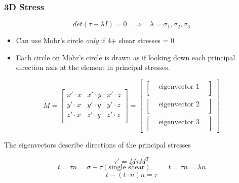 \documentclass[twocolumn, 12pt]{article}    %
\begin{document}
\subsubsection*{3D Stress}
\begin{equation*}
    det(\tau -\lambda I) = 0 \hspace{10pt}\Longrightarrow \hspace{10pt}\lambda = \sigma_1,\sigma_2,\sigma_3
\end{equation*}
\begin{itemize}
    \item Can use Mohr's circle \emph{only} if 4+ shear stresses = 0\\
    \item Each circle on Mohr's circle is drawn as if looking down each principal direction axis at the element in principal stresses. 
\end{itemize}
\begin{equation*}
    M= \begin{bmatrix}
    x'\cdot x & x'\cdot y & x' \cdot z\\
    y'\cdot x & y'\cdot y & y' \cdot z\\
    z'\cdot x & z'\cdot y & z' \cdot z\\
\end{bmatrix} = 
\begin{bmatrix}
    \begin{bmatrix}
        & \text{eigenvector 1} &\\
    \end{bmatrix}\\
    \begin{bmatrix}
        & \text{eigenvector 2} &\\
    \end{bmatrix}\\
    \begin{bmatrix}
        & \text{eigenvector 3} &\\
    \end{bmatrix}
\end{bmatrix}
\end{equation*}
\begin{center}
    The eigenvectors describe directions of the principal stresses 
\end{center}
\begin{equation*}
    \tau' = M\tau M^T
\end{equation*}
\begin{equation*}
    t=\tau n = \sigma + \tau(\text{single shear}) \hspace{30pt} t=\tau n = \lambda n  
\end{equation*}
\begin{equation*}
    t -(t\cdot n)n = \tau
\end{equation*}
\end{document}
